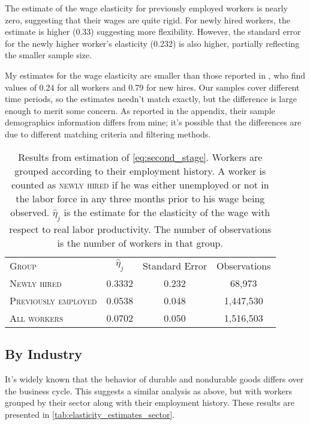 \documentclass[11pt]{article}
\begin{document}
The estimate of the wage elasticity for previously employed workers is nearly zero, suggesting that their wages are quite rigid.
For newly hired workers, the estimate is higher (0.33) suggesting more flexibility.
However, the standard error for the newly higher worker's elasticity (0.232) is also higher, partially reflecting the smaller sample size.

My estimates for the wage elasticity are smaller than those reported in \cite{haefke_sonntag_vanRens_2013},  who find values of 0.24 for all workers and 0.79 for new hires.
Our samples cover different time periods, so the estimates needn't match exactly, but the difference is large enough to merit some concern.
As reported in the appendix, their sample demographics information differs from mine;
it's possible that the differences are due to different matching criteria and filtering methods.

\begin{table}
    \centering
    \begin{tabular}{lccc} \toprule
        \textsc{Group}               & $\hat{\eta}_j$ & Standard Error & Observations\\
        \textsc{Newly hired}         & 0.3332       & 0.232            & 68,973       \\
        \textsc{Previously employed} & 0.0538       & 0.048            & 1,447,530     \\
        \textsc{All workers}         & 0.0702       & 0.050            & 1,516,503     \\ \bottomrule
    \end{tabular}
    \caption{
                Results from estimation of \autoref{eq:second_stage}.
                Workers are grouped according to their employment history.
                A worker is counted as \textsc{newly hired} if he was either unemployed
                or not in the labor force in any three months prior to his wage
                being observed. $\hat{\eta}_j$ is the estimate for the elasticity of the wage with respect to real labor productivity.
                The number of observations is the number of workers in that group.
            }
    \label{tab:elasticity_estimates}
\end{table}

\subsection{By Industry}

It's widely known that the behavior of durable and nondurable goods differs over the business cycle.
This suggests a similar analysis as above, but with workers grouped by their sector along with their employment history.
These results are presented in \autoref{tab:elasticity_estimates_sector}.
\end{document}
